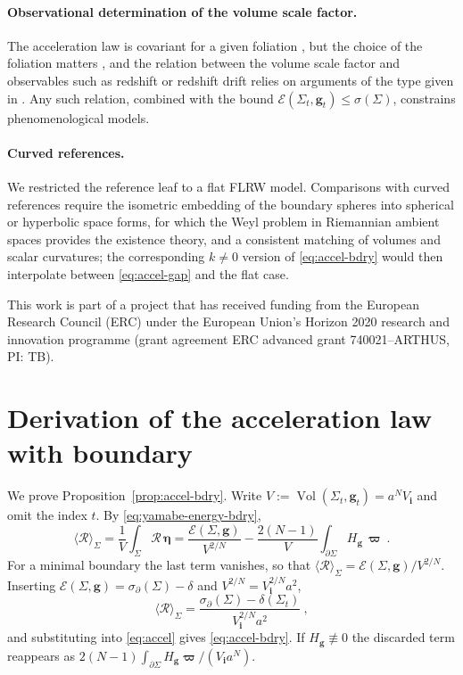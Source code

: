 \documentclass[aps,prd,reprint,amsmath,amssymb,nofootinbib,longbibliography]{revtex4-2}
\DeclareMathOperator{\Vol}{Vol}
\newcommand{\g}{\mathbf{g}}                 %
\newcommand{\Rs}{\mathcal{R}}               %
\newcommand{\vol}{\boldsymbol{\eta}}        %
\newcommand{\bvol}{\boldsymbol{\varpi}}     %
\newcommand{\sigbd}{\sigma_\partial}       %
\newcommand{\ini}[1]{{#1}_{\mathbf{i}}}     %
\newcommand{\EH}{\mathcal{E}}               %
\theoremstyle{plain}
\theoremstyle{definition}
\theoremstyle{remark}
\begin{document}
\paragraph*{Observational determination of the volume scale factor.}
The acceleration law is covariant for a given foliation \cite{heinesen2019covariance}, but the choice of the foliation matters \cite{buchert2018cosmological}, and the relation between the volume scale factor and observables such as redshift or redshift drift relies on arguments of the type given in \cite{rasanen2009light}. Any such relation, combined with the bound $\EH(\Sigma_t,\g_t)\le\sigma(\Sigma)$, constrains phenomenological models.

\paragraph*{Curved references.}
We restricted the reference leaf to a flat FLRW model. Comparisons with curved references require the isometric embedding of the boundary spheres into spherical or hyperbolic space forms, for which the Weyl problem in Riemannian ambient spaces \cite{MR4123102} provides the existence theory, and a consistent matching of volumes and scalar curvatures; the corresponding $k\ne0$ version of \eqref{eq:accel-bdry} would then interpolate between \eqref{eq:accel-gap} and the flat case.

\begin{acknowledgments}
This work is part of a project that has received funding from the European Research Council (ERC) under the European Union's Horizon 2020 research and innovation programme (grant agreement ERC advanced grant 740021--ARTHUS, PI: TB).
\end{acknowledgments}

\appendix

\section{Derivation of the acceleration law with boundary}
\label{app:derivation}

We prove Proposition~\ref{prop:accel-bdry}. Write $V:=\Vol(\Sigma_t,\g_t)=a^N\ini V$ and omit the index $t$. By \eqref{eq:yamabe-energy-bdry},
\begin{equation*}
\langle\Rs\rangle_\Sigma=\frac{1}{V}\int_\Sigma\Rs\,\vol=\frac{\EH(\Sigma,\g)}{V^{2/N}}-\frac{2(N-1)}{V}\int_{\partial\Sigma}H_\g\,\bvol\ .
\end{equation*}
For a minimal boundary the last term vanishes, so that $\langle\Rs\rangle_\Sigma=\EH(\Sigma,\g)/V^{2/N}$. Inserting $\EH(\Sigma,\g)=\sigbd(\Sigma)-\delta$ and $V^{2/N}=\ini V^{2/N}a^2$,
\begin{equation*}
\langle\Rs\rangle_\Sigma=\frac{\sigbd(\Sigma)-\delta(\Sigma_t)}{\ini V^{2/N}a^2}\ ,
\end{equation*}
and substituting into \eqref{eq:accel} gives \eqref{eq:accel-bdry}. If $H_\g\not\equiv0$ the discarded term reappears as $2(N-1)\int_{\partial\Sigma}H_\g\bvol/(\ini V a^N)$.
\end{document}
